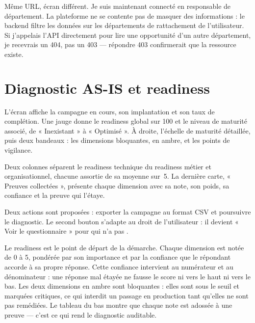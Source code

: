 
\begin{oral}
Même URL, écran différent. Je suis maintenant connecté en responsable de département.
La plateforme ne se contente pas de masquer des informations : le backend filtre les
données sur les départements de rattachement de l'utilisateur. Si j'appelais l'API
directement pour lire une opportunité d'un autre département, je recevrais un 404, pas
un 403 — répondre 403 confirmerait que la ressource existe.
\end{oral}

\section{Diagnostic AS-IS et readiness}

L'écran affiche la campagne en cours, son implantation et son taux de complétion. Une
jauge donne le readiness global sur 100 et le niveau de maturité associé, de
« Inexistant » à « Optimisé ». À droite, l'échelle de maturité détaillée, puis deux
bandeaux : les dimensions bloquantes, en ambre, et les points de vigilance.

Deux colonnes séparent le readiness technique du readiness métier et organisationnel,
chacune assortie de sa moyenne sur~5. La dernière carte, « Preuves collectées »,
présente chaque dimension avec sa note, son poids, sa confiance et la preuve qui
l'étaye.

Deux actions sont proposées : exporter la campagne au format CSV et poursuivre le
diagnostic. Le second bouton s'adapte au droit de l'utilisateur : il devient « Voir le
questionnaire » pour qui n'a pas .


\begin{oral}
Le readiness est le point de départ de la démarche. Chaque dimension est notée de 0 à 5,
pondérée par son importance et par la confiance que le répondant accorde à sa propre
réponse. Cette confiance intervient au numérateur et au dénominateur : une réponse mal
étayée ne fausse le score ni vers le haut ni vers le bas. Les deux dimensions en ambre
sont bloquantes : elles sont sous le seuil et marquées critiques, ce qui interdit un
passage en production tant qu'elles ne sont pas remédiées. Le tableau du bas montre que
chaque note est adossée à une preuve — c'est ce qui rend le diagnostic auditable.
\end{oral}

